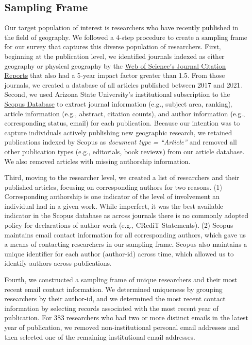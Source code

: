 \documentclass[]{interact}
\theoremstyle{plain}%
\theoremstyle{definition}
\theoremstyle{remark}
\begin{document}
\subsection*{Sampling Frame}
Our target population of interest is researchers who have recently published in the field of geography. 
We followed a 4-step procedure to create a sampling frame for our survey that captures this diverse population of researchers. First, beginning at the publication level, we identified journals indexed as either geography or physical geography by the \href{https://access.clarivate.com/}{Web of Science's Journal Citation Reports} that also had a 5-year impact factor greater than 1.5.
From those journals, we created a database of all articles published between 2017 and 2021.  
Second, we used Arizona State University's institutional subscription to the \href{https://www.scopus.com/home.uri}{Scopus Database} to extract journal information (e.g., subject area, ranking), article information (e.g., abstract, citation counts), and author information (e.g., corresponding status, email) for each publication. 
Because our intention was to capture individuals actively publishing new geographic research, we retained publications indexed by Scopus as \textit{document type = ``Article''} and removed all other publication types (e.g., editorials, book reviews) from our article database. 
We also removed articles with missing authorship information. 

Third, moving to the researcher level, we created a list of researchers and their published articles, focusing on corresponding authors for two reasons.
(1) Corresponding authorship is one indicator of the level of involvement an individual had in a given work. 
While imperfect, it was the best available indicator in the Scopus database as across journals there is no commonly adopted policy for declarations of author work (e.g., CRediT Statements).
(2) Scopus maintains email contact information for all corresponding authors, which gave us a means of contacting researchers in our sampling frame.
Scopus also maintains a unique identifier for each author (author-id) across time, which allowed us to identify authors across publications. 

Fourth, we constructed a sampling frame of unique researchers and their most recent email contact information. 
We determined uniqueness by grouping researchers by their author-id, and we determined the most recent contact information by selecting records associated with the most recent year of publication. 
For 383 researchers who had two or more distinct emails in the latest year of publication, we removed non-institutional personal email addresses and then selected one of the remaining institutional email addresses.
\end{document}
